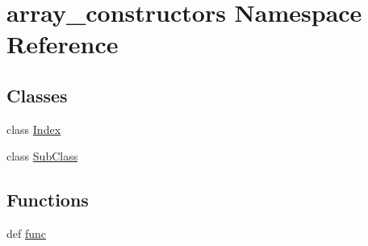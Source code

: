 \hypertarget{namespacearray__constructors}{}\section{array\+\_\+constructors Namespace Reference}
\label{namespacearray__constructors}
\subsection*{Classes}
\begin{DoxyCompactItemize}
\item 
class \hyperlink{classarray__constructors_1_1Index}{Index}
\item 
class \hyperlink{classarray__constructors_1_1SubClass}{Sub\+Class}
\end{DoxyCompactItemize}
\subsection*{Functions}
\begin{DoxyCompactItemize}
\item 
def \hyperlink{namespacearray__constructors_ab09f915c34699a2a5cfd01d6b5921a22}{func}
\end{DoxyCompactItemize}
